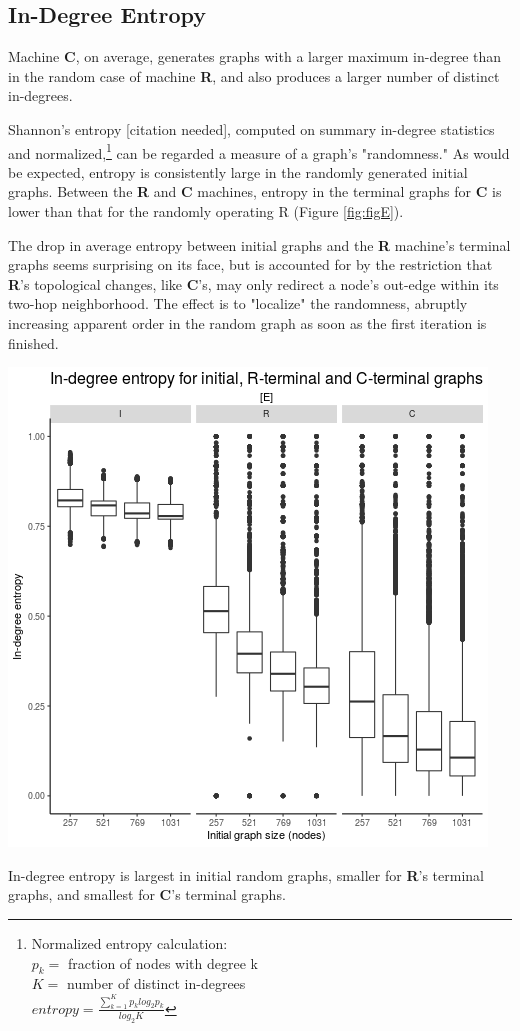 \documentclass{tufte-handout}
\begin{document}
\clearpage

\subsection{In-Degree Entropy}

Machine \textbf{C}, on average, generates graphs with a larger 
maximum in-degree than in the random case of machine \textbf{R}, and also produces a
larger number of distinct in-degrees.

Shannon's entropy [citation needed], computed on summary in-degree statistics and
normalized,\footnote{
Normalized entropy calculation: \\
\vspace{2mm}
$p_{k}=$ fraction of nodes with degree k \\
$K=$ number of distinct in-degrees \\
\vspace{2mm}
$entropy = \frac{\sum_{k=1}^{K} p_{k} log_{2}p_{k}} {log_{2}K}$}
can be regarded a measure of a graph's "randomness."
As would be expected, entropy is consistently large in the randomly generated
initial graphs. Between the \textbf{R} and \textbf{C} machines, entropy in the terminal
graphs for \textbf{C} is lower than that for the randomly operating R (Figure \ref{fig:figE}).

The drop in average entropy between initial graphs and the \textbf{R} machine's terminal
graphs seems surprising on its face, but is accounted for by the restriction that
\textbf{R}'s topological changes, like \textbf{C}'s, may only redirect a node's out-edge
within its two-hop neighborhood.
The effect is to "localize" the randomness, abruptly increasing apparent order in the
random graph as soon as the first iteration is finished.

\begin{marginfigure}
  \includegraphics{figE.png}
  \caption{In-degree entropy is largest in initial random graphs,
        smaller for \textbf{R}'s terminal graphs, and smallest for \textbf{C}'s terminal graphs.}
  \label{fig:figE}
\end{marginfigure}
\end{document}
